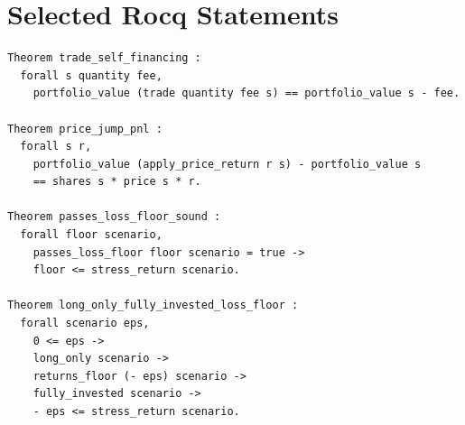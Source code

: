 \documentclass[11pt]{article}
\begin{document}
\section{Selected Rocq Statements}

\begin{lstlisting}[language=Coq]
Theorem trade_self_financing :
  forall s quantity fee,
    portfolio_value (trade quantity fee s) == portfolio_value s - fee.

Theorem price_jump_pnl :
  forall s r,
    portfolio_value (apply_price_return r s) - portfolio_value s
    == shares s * price s * r.

Theorem passes_loss_floor_sound :
  forall floor scenario,
    passes_loss_floor floor scenario = true ->
    floor <= stress_return scenario.

Theorem long_only_fully_invested_loss_floor :
  forall scenario eps,
    0 <= eps ->
    long_only scenario ->
    returns_floor (- eps) scenario ->
    fully_invested scenario ->
    - eps <= stress_return scenario.
\end{lstlisting}



\end{document}
